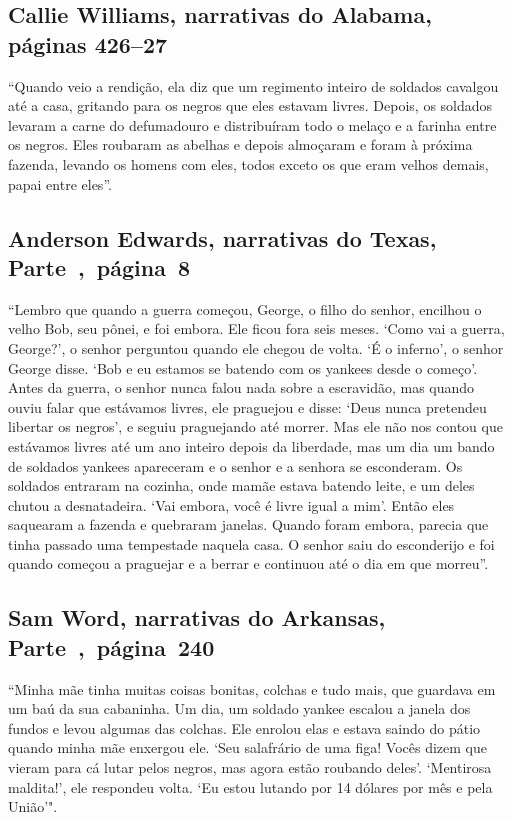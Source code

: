 \subsection{Callie Williams, narrativas do Alabama, páginas 426--27}
\label{ref290}

``Quando veio a rendição, ela diz que um regimento inteiro de soldados
cavalgou até a casa, gritando para os negros que eles estavam livres.
Depois, os soldados levaram a carne do defumadouro e distribuíram todo o
melaço e a farinha entre os negros. Eles roubaram as abelhas e depois
almoçaram e foram à próxima fazenda, levando os homens com eles, todos
exceto os que eram velhos demais, papai entre eles''.

\subsection{Anderson Edwards, narrativas do Texas, Parte~,~página~8} \label{ref81}

``Lembro que quando a guerra começou, George, o filho do senhor,
encilhou o velho Bob, seu pônei, e foi embora. Ele ficou fora seis
meses. `Como vai a guerra, George?', o senhor perguntou quando ele
chegou de volta. `É o inferno', o senhor George disse. `Bob e eu estamos
se batendo com os yankees desde o começo'. Antes da guerra, o senhor
nunca falou nada sobre a escravidão, mas quando ouviu falar que
estávamos livres, ele praguejou e disse: `Deus nunca pretendeu libertar
os negros', e seguiu praguejando até morrer. Mas ele não nos contou que
estávamos livres até um ano inteiro depois da liberdade, mas um dia um
bando de soldados yankees apareceram e o senhor e a senhora se
esconderam. Os soldados entraram na cozinha, onde mamãe estava batendo
leite, e um deles chutou a desnatadeira. `Vai embora, você é livre igual
a mim'. Então eles saquearam a fazenda e quebraram janelas. Quando foram
embora, parecia que tinha passado uma tempestade naquela casa. O senhor
saiu do esconderijo e foi quando começou a praguejar e a berrar e
continuou até o dia em que morreu''.

\subsection{Sam Word, narrativas do Arkansas, Parte~,~página~240}
\label{ref315}

``Minha mãe tinha muitas coisas bonitas, colchas e tudo mais, que
guardava em um baú da sua cabaninha. Um dia, um soldado yankee escalou a
janela dos fundos e levou algumas das colchas. Ele enrolou elas e estava
saindo do pátio quando minha mãe enxergou ele. `Seu salafrário de uma
figa! Vocês dizem que vieram para cá lutar pelos negros, mas agora estão
roubando deles'. `Mentirosa maldita!', ele respondeu volta. `Eu estou
lutando por 14 dólares por mês e pela União'".

